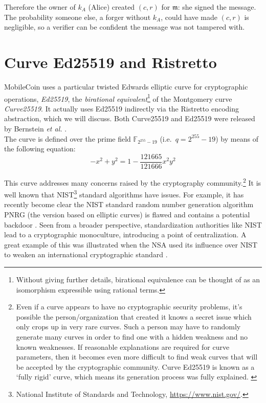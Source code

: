 Therefore the owner of $k_A$ (Alice) created $(c,r)$ for $\mathfrak{m}$: she signed the message. The probability someone else, a forger without $k_A$, could have made $(c,r)$ is negligible, so a verifier can be confident the message was not tampered with.



\section{Curve Ed25519 and Ristretto}
\label{sec:ed25519-and-ristretto}

MobileCoin uses a particular twisted Edwards elliptic curve for cryptographic operations, {\em Ed25519}, the {\em birational equivalent}\footnote{\label{birational_note}Without giving further details, birational equivalence can be thought of as an isomorphism expressible using rational terms.} 
of the Montgomery curve {\em Curve25519}. It actually uses Ed25519 indirectly via the Ristretto encoding abstraction, which we will discuss. Both Curve25519 and Ed25519 were released by Bernstein {\em et al.} \cite{Bernstein2008-twisted-edwards, Bernstein2012-high-speed-high-security-ed25519, Bernstein2007-faster-ec-ops}.\\

The curve is defined over the prime field \(\mathbb{F}_{2^{255} - 19}\) (i.e.\ $q = 2^{255}-19$) by means of the following equation:\vspace{.155cm}
\[-x^2 + y^2 = 1 - \frac{121665}{121666} x^2 y^2\]

This curve addresses many concerns raised by the cryptography community.\footnote{Even if a curve appears to have no cryptographic security problems, it's possible the person/organization that created it knows a secret issue which only crops up in very rare curves. Such a person may have to randomly generate many curves in order to find one with a hidden weakness and no known weaknesses. If reasonable explanations are required for curve parameters, then it becomes even more difficult to find weak curves that will be accepted by the cryptographic community. Curve Ed25519 is known as a `fully rigid' curve, which means its generation process was fully explained. \cite{elliptic-curve-rigidity}} It is well known that NIST\footnote{\label{NIST_note}National Institute of Standards and Technology, \url{https://www.nist.gov/}.} 
standard algorithms have issues. For example, it has recently become clear the NIST standard random number generation algorithm PNRG (the version based on elliptic curves) is flawed and contains a potential backdoor \cite{hales2014nsa}. Seen from a broader perspective, standardization authorities like NIST lead to a cryptographic monoculture, introducing a point of centralization. A great example of this was illustrated when the NSA used its influence over NIST to weaken an international cryptographic standard \cite{NSA-NIST}.

